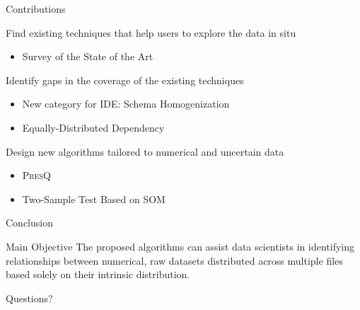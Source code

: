 \documentclass[10pt]{beamer}
\newcommand{\PresQ}[0]{\textsc{PresQ}\xspace}
\begin{document}
\begin{frame}{Contributions}

\begin{alertblock}{ Find existing techniques that help users to explore the data in situ}
    \begin{itemize}
        \item Survey of the State of the Art
    \end{itemize}
\end{alertblock}

\begin{alertblock}{ Identify gaps in the coverage of the existing techniques}
    \begin{itemize}
        \item New category for IDE: \alert{Schema Homogenization}
        \item Equally-Distributed Dependency
    \end{itemize}
\end{alertblock}

\begin{alertblock}{ Design new algorithms tailored to numerical and uncertain data}
    \begin{itemize}
        \item \PresQ
        \item Two-Sample Test Based on SOM
    \end{itemize}
\end{alertblock}

\end{frame}

\begin{frame}{Conclusion}

\begin{block}{ Main Objective}
    The proposed algorithms can assist data scientists in identifying relationships
    between numerical, raw datasets distributed across multiple files
    based solely on their intrinsic distribution.
\end{block}

\end{frame}

\appendix

{
\begin{frame}[standout]
  \huge Questions?
\end{frame}
}
\end{document}
